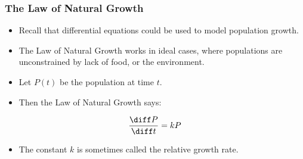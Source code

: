 \begin{frame}
\frametitle{The Law of Natural Growth}
\begin{itemize}
\item  Recall that differential equations could be used to model population growth.
\item  The Law of Natural Growth works in ideal cases, where populations are unconstrained by lack of food, or the environment.
\item  Let $P(t)$ be the population at time $t$.
\item  Then the Law of Natural Growth says:
\end{itemize}
\[
\frac{\diff P}{\diff t} = kP
\]
\begin{itemize}
\item  The constant $k$ is sometimes called the relative growth rate.
\end{itemize}
\end{frame}
